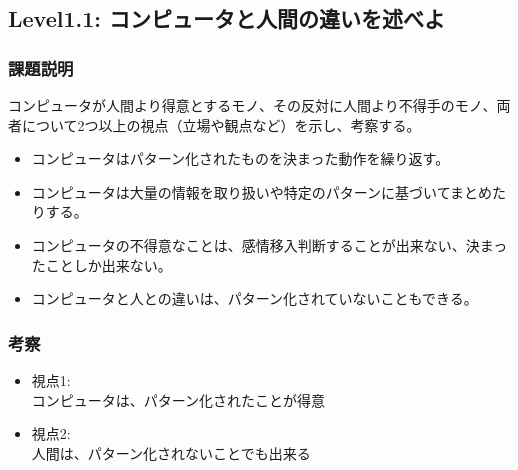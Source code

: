 \subsection{Level1.1: コンピュータと人間の違いを述べよ}
\subsubsection{課題説明}
コンピュータが人間より得意とするモノ、その反対に人間より不得手のモノ、両者について2つ以上の視点（立場や観点など）を示し、考察する。\\
\begin{itemize}
\item コンピュータはパターン化されたものを決まった動作を繰り返す。
\item コンピュータは大量の情報を取り扱いや特定のパターンに基づいてまとめたりする。\\
\item コンピュータの不得意なことは、感情移入判断することが出来ない、決まったことしか出来ない。
\item コンピュータと人との違いは、パターン化されていないこともできる。
\end{itemize}
\subsubsection{考察}
\begin{itemize}
 \item 視点1: \\
コンピュータは、パターン化されたことが得意\\
 \item 視点2: \\
人間は、パターン化されないことでも出来る\\
\end{itemize}

